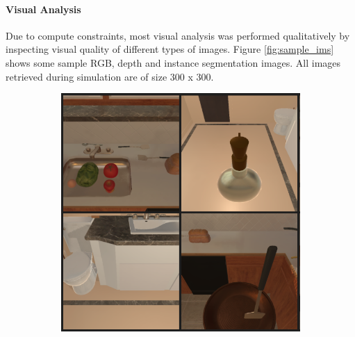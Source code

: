 \documentclass[11pt,a4paper]{article}
\begin{document}
\paragraph{Visual Analysis}
Due to compute constraints, most visual analysis was performed qualitatively by inspecting visual quality of different types of images. Figure \ref{fig:sample_ims} shows some sample RGB, depth and instance segmentation images. All images retrieved during simulation are of size 300 x 300.

\begin{figure}
     \centering
     \begin{subfigure}[b]{0.32\textwidth}
         \centering
         \includegraphics[width=\textwidth]{figures/rgb.png}
         \caption{}
     \end{subfigure}
     \hfill
     \begin{subfigure}[b]{0.32\textwidth}
         \centering

\end{subfigure}
\end{figure}
\end{document}
